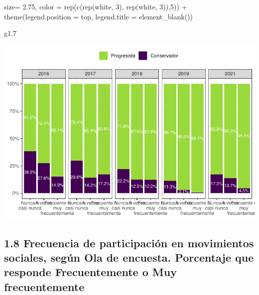 \documentclass[
  12pt,
]{book}
\newenvironment{Shaded}{\begin{snugshade}}{\end{snugshade}}
\newcommand{\AttributeTok}[1]{\textcolor[rgb]{0.77,0.63,0.00}{#1}}
\newcommand{\DecValTok}[1]{\textcolor[rgb]{0.00,0.00,0.81}{#1}}
\newcommand{\FloatTok}[1]{\textcolor[rgb]{0.00,0.00,0.81}{#1}}
\newcommand{\FunctionTok}[1]{\textcolor[rgb]{0.00,0.00,0.00}{#1}}
\newcommand{\NormalTok}[1]{#1}
\newcommand{\SpecialCharTok}[1]{\textcolor[rgb]{0.00,0.00,0.00}{#1}}
\newcommand{\StringTok}[1]{\textcolor[rgb]{0.31,0.60,0.02}{#1}}
\begin{document}
\begin{Shaded}
\begin{Highlighting}[]
            \AttributeTok{size=} \FloatTok{2.75}\NormalTok{,}
            \AttributeTok{color =} \FunctionTok{rep}\NormalTok{(}\FunctionTok{c}\NormalTok{(}\FunctionTok{rep}\NormalTok{(}\StringTok{\textquotesingle{}white\textquotesingle{}}\NormalTok{, }\DecValTok{3}\NormalTok{),}
                          \FunctionTok{rep}\NormalTok{(}\StringTok{\textquotesingle{}white\textquotesingle{}}\NormalTok{, }\DecValTok{3}\NormalTok{)),}\DecValTok{5}\NormalTok{)) }\SpecialCharTok{+} 
  \FunctionTok{theme}\NormalTok{(}\AttributeTok{legend.position =} \StringTok{\textquotesingle{}top\textquotesingle{}}\NormalTok{,}
        \AttributeTok{legend.title =} \FunctionTok{element\_blank}\NormalTok{())}

\NormalTok{g1}\FloatTok{.7}
\end{Highlighting}
\end{Shaded}

\includegraphics{reporte-elsoc_files/figure-latex/unnamed-chunk-12-1.pdf}

\hypertarget{frecuencia-de-participaciuxf3n-en-movimientos-sociales-seguxfan-ola-de-encuesta.-porcentaje-que-responde-frecuentemente-o-muy-frecuentemente}{%
\subsection{1.8 Frecuencia de participación en movimientos sociales, según Ola de encuesta. Porcentaje que responde Frecuentemente o Muy frecuentemente}\label{frecuencia-de-participaciuxf3n-en-movimientos-sociales-seguxfan-ola-de-encuesta.-porcentaje-que-responde-frecuentemente-o-muy-frecuentemente}}
\end{document}
